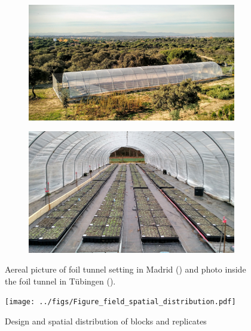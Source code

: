 \documentclass[12pt,]{article}
\begin{document}
\begin{figure}
    \centering
    \begin{subfigure}[t]{0.45\textwidth}
        \centering
        \includegraphics[width=\linewidth]{../figs/IMG_20151113_154250988.jpg}
        \caption{} \label{fig:aereal}
    \end{subfigure}
    \begin{subfigure}[t]{0.45\textwidth}
        \centering
        \includegraphics[width=\linewidth]{../figs/IMG_20151121_162359474_HDR.jpg}
        \caption{} \label{fig:inside}
    \end{subfigure}
     \caption{Aereal picture of foil tunnel setting in Madrid () and photo inside the foil tunnel in Tübingen ().}
     \label{fig:fieldsetup}
\end{figure}

\begin{figure}
 \centerline{\texttt{[image: ../figs/Figure\_field\_spatial\_distribution.pdf]}}
    \caption{ Design and spatial distribution of blocks and replicates}
    \label{fig:blocks}
\end{figure}
\end{document}
